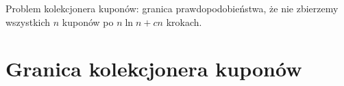 {
\makeatletter
{}
\makeatother
\graphicspath{{../probabil}}

\begin{questiontext}
	Problem kolekcjonera kuponów: granica prawdopodobieństwa, że nie zbierzemy wszystkich \(n\) kuponów po \(n \ln n + cn\) krokach.
\end{questiontext}

\section{Granica kolekcjonera kuponów}
 {
 }
}
